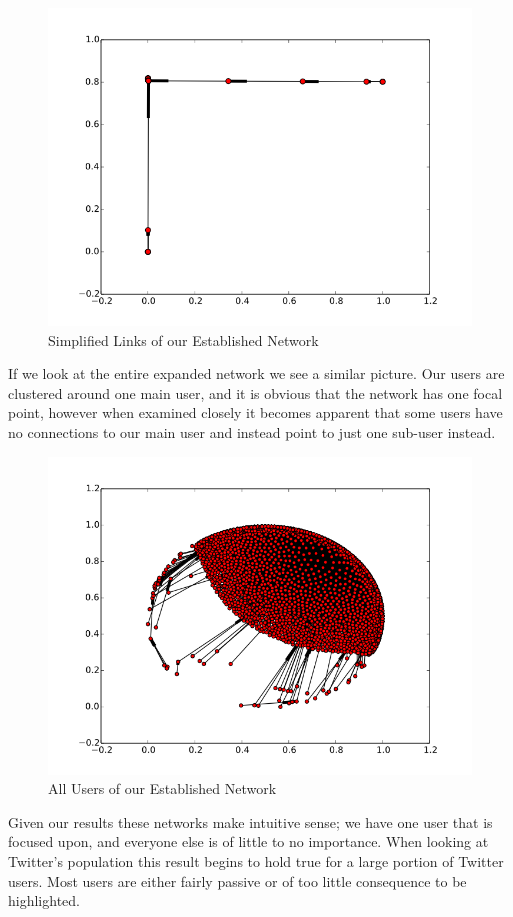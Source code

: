 \begin{figure}[ht]
    \centering
    \includegraphics[scale=0.8]{./img/links.png}
    \caption{Simplified Links of our Established Network}
    \label{fig:links}
\end{figure}

If we look at the entire expanded network we see a similar picture. Our users are clustered around one main user, and it is obvious that the network has one focal point, however when examined closely it becomes apparent that some users have no connections to our main user and instead point to just one sub-user instead.

\begin{figure}[ht]
    \centering
    \includegraphics[scale=0.8]{./img/users.png}
    \caption{All Users of our Established Network}
    \label{fig:users}
\end{figure}

Given our results these networks make intuitive sense; we have one user that is focused upon, and everyone else is of little to no importance. When looking at Twitter's population this result begins to hold true for a large portion of Twitter users. Most users are either fairly passive or of too little consequence to be highlighted.
